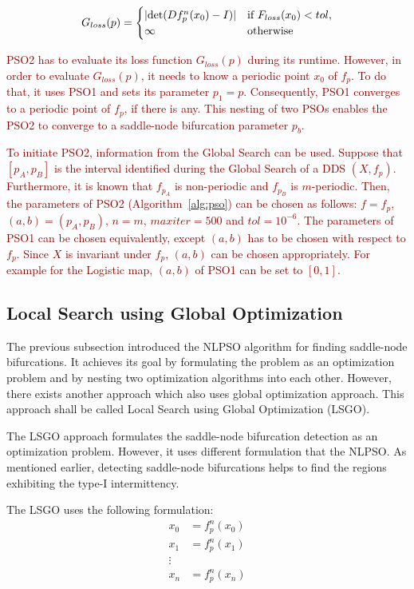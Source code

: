 \begin{equation}
\label{eq:minimize_p}
    G_{loss}(p) =
    \begin{cases}
        |\text{det}(Df^{n}_{p}(x_0)-I)| & \text{if } F_{loss}(x_0) < tol, \\
        \infty & \rm{otherwise}
    \end{cases}
\end{equation}

\textcolor{darkred}{
PSO2 has to evaluate its loss function $G_{loss}(p)$ during its runtime.
However, in order to evaluate $G_{loss}(p)$, it needs to know a periodic point $x_0$ of $f_{p}$.
To do that, it uses PSO1 and sets its parameter $p_{1} = p$.
Consequently, PSO1 converges to a periodic point of $f_{p}$, if there is any.
This nesting of two PSOs enables the PSO2 to converge to a saddle-node bifurcation parameter $p_{b}$.
}
\par
\textcolor{darkred}{
To initiate PSO2, information from the Global Search can be used.
Suppose that $[p_{A}, p_{B}]$ is the interval identified during the Global Search of a DDS $(X, f_{p})$.
Furthermore, it is known that $f_{p_{A}}$ is non-periodic and $f_{p_{B}}$ is $m$-periodic.
Then, the parameters of PSO2 (Algorithm~\ref{alg:pso}) can be chosen as follows: $f = f_{p}$, $(a, b) = (p_{A}, p_{B})$, $n = m$, $maxiter = 500$ and $tol = 10^{-6}$.
The parameters of PSO1 can be chosen equivalently, except $(a, b)$ has to be chosen with respect to $f_{p}$.
Since $X$ is invariant under $f_{p}$, $(a, b)$ can be chosen appropriately.
For example for the Logistic map, $(a, b)$ of PSO1 can be set to $[0, 1]$.
}


\subsection{Local Search using Global Optimization}

The previous subsection introduced the NLPSO algorithm for finding saddle-node bifurcations.
It achieves its goal by formulating the problem as an optimization problem and by nesting two optimization algorithms into each other.
However, there exists another approach which also uses global optimization approach.
This approach shall be called Local Search using Global Optimization (LSGO).
\par
The LSGO approach formulates the saddle-node bifurcation detection as an optimization problem.
However, it uses different formulation that the NLPSO.
As mentioned earlier, detecting saddle-node bifurcations helps to find the regions exhibiting the type-I intermittency.
\par
The LSGO uses the following formulation:
\begin{align*} 
x_0 &= f_{p}^{n}(x_0)\\
x_1 &= f_{p}^{n}(x_1)\\
\vdots \\
x_n &= f_{p}^{n}(x_n)\\
\end{align*}

